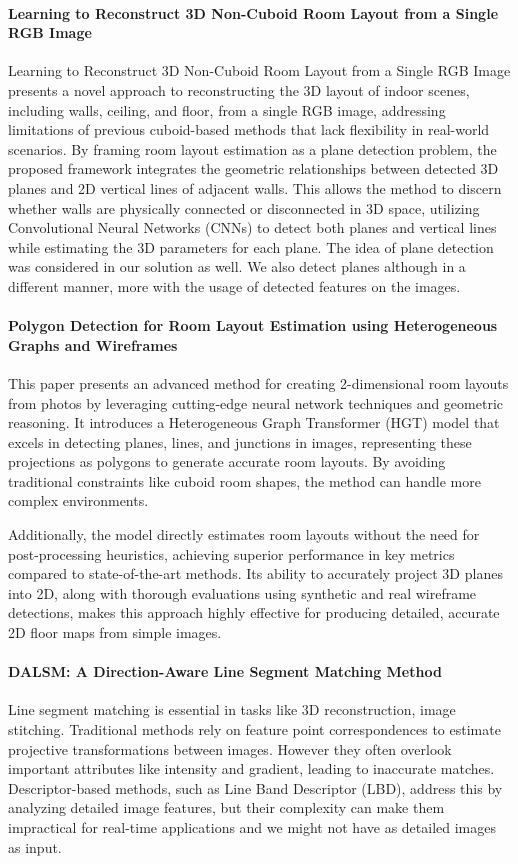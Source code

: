 \paragraph{Learning to Reconstruct 3D Non-Cuboid Room Layout from a Single RGB Image}
Learning to Reconstruct 3D Non-Cuboid Room Layout from a Single RGB Image\cite{9707088} presents a novel approach to reconstructing the 3D layout of indoor scenes, including walls, ceiling, and floor, from a single RGB image, addressing limitations of previous cuboid-based methods that lack flexibility in real-world scenarios. By framing room layout estimation as a plane detection problem, the proposed framework integrates the geometric relationships between detected 3D planes and 2D vertical lines of adjacent walls. This allows the method to discern whether walls are physically connected or disconnected in 3D space, utilizing Convolutional Neural Networks (CNNs) to detect both planes and vertical lines while estimating the 3D parameters for each plane. The idea of plane detection was considered in our solution as well. We also detect planes although in a different manner, more with the usage of detected features on the images. 

\paragraph{Polygon Detection for Room Layout Estimation using Heterogeneous Graphs and Wireframes}
This paper \cite{10350607} presents an advanced method for creating 2-dimensional room layouts from photos by leveraging cutting-edge neural network techniques and geometric reasoning. 
It introduces a Heterogeneous Graph Transformer (HGT) model that excels in detecting planes, lines, and junctions in images, representing these projections as polygons to generate accurate room layouts. 
By avoiding traditional constraints like cuboid room shapes, the method can handle more complex environments. 

Additionally, the model directly estimates room layouts without the need for post-processing heuristics, achieving superior performance in key metrics compared to state-of-the-art methods. 
Its ability to accurately project 3D planes into 2D, along with thorough evaluations using synthetic and real wireframe detections, makes this approach highly effective for producing detailed, accurate 2D floor maps from simple images.

\paragraph{DALSM: A Direction-Aware Line Segment Matching Method}
Line segment matching is essential in tasks like 3D reconstruction, image stitching. Traditional methods rely on feature point correspondences to estimate projective transformations between images. 
However they often overlook important attributes like intensity and gradient, leading to inaccurate matches. 
Descriptor-based methods, such as Line Band Descriptor (LBD), address this by analyzing detailed image features, but their complexity can make them impractical for real-time applications and we might not have as detailed images as input.

